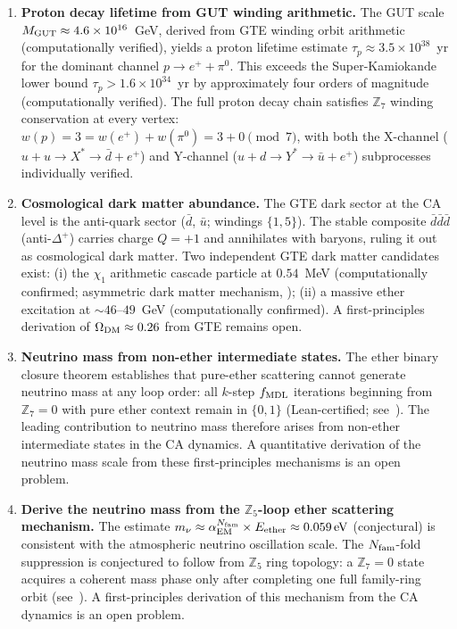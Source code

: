 \documentclass[11pt]{article}
\theoremstyle{remark}
\begin{document}
\begin{enumerate}
\item \textbf{Proton decay lifetime from GUT winding arithmetic.}
The GUT scale $M_{\rm GUT} \approx 4.6 \times 10^{16}$~GeV, derived from GTE winding orbit
arithmetic (computationally verified), yields a proton lifetime estimate
$\tau_p \approx 3.5 \times 10^{38}$~yr for the dominant channel
$p \to e^+ + \pi^0$.
This exceeds the Super-Kamiokande lower bound
$\tau_p > 1.6 \times 10^{34}$~yr by approximately four orders of magnitude (computationally verified).
The full proton decay chain satisfies $\mathbb{Z}_7$ winding conservation at every vertex:
$w(p) = 3 = w(e^+) + w(\pi^0) = 3 + 0 \pmod{7}$, with both the X-channel
($u + u \to X^* \to \bar{d} + e^+$) and Y-channel
($u + d \to Y^* \to \bar{u} + e^+$) subprocesses individually verified.

\item \textbf{Cosmological dark matter abundance.}
The GTE dark sector at the CA level is the anti-quark sector ($\bar{d}$, $\bar{u}$;
windings $\{1,5\}$). The stable composite $\bar{d}\bar{d}\bar{d}$ (anti-$\Delta^+$)
carries charge $Q=+1$ and annihilates with baryons, ruling it out as cosmological dark
matter. Two independent GTE dark matter candidates exist: (i) the $\chi_1$ arithmetic
cascade particle at $0.54$~MeV (computationally confirmed; asymmetric dark matter mechanism,
\cite{SpivackMirrorBraidAtlas}); (ii) a massive ether excitation at ${\sim}46$--$49$~GeV
(computationally confirmed). A first-principles derivation of $\Omega_{\rm DM} \approx 0.26$ from GTE
remains open.

\item \textbf{Neutrino mass from non-ether intermediate states.}
The ether binary closure theorem establishes that pure-ether scattering cannot generate
neutrino mass at any loop order: all $k$-step $f_{\rm MDL}$ iterations beginning from
$\mathbb{Z}_7=0$ with pure ether context remain in $\{0,1\}$ (Lean-certified;
see~\cite{SpivackDeeperConsequences}).
The leading contribution to neutrino mass therefore arises from non-ether intermediate
states in the CA dynamics.
A quantitative derivation of the neutrino mass scale from these first-principles
mechanisms is an open problem.

\item \textbf{Derive the neutrino mass from the $\mathbb{Z}_5$-loop ether scattering mechanism.}
The estimate $m_\nu \approx \alpha_{\rm EM}^{N_{\rm fam}} \times E_{\rm ether} \approx 0.059\,{\rm eV}$
(conjectural) is consistent with the atmospheric neutrino oscillation scale.
The $N_{\rm fam}$-fold suppression is conjectured to follow from $\mathbb{Z}_5$ ring topology:
a $\mathbb{Z}_7=0$ state acquires a coherent mass phase only after completing one full
family-ring orbit (see~\cite{SpivackDeeperConsequences}).
A first-principles derivation of this mechanism from the CA dynamics is an open problem.

\end{enumerate}
\end{document}
